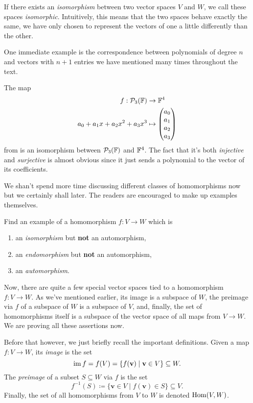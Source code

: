 If there exists an \emph{isomorphism} between two vector spaces $V$ and $W$, we
call these spaces \emph{isomorphic}. Intuitively, this means that the two spaces
behave exactly the same, we have only chosen to represent the vectors of one a
little differently than the other.

One immediate example is the correspondence between polynomials of degree $n$
and vectors with $n + 1$ entries we have mentioned many times throughout the
text.

The map
\begin{align*}
 f: \mathcal{P}_3(\mathbb{F}) &\to \mathbb{F}^{4}\\
 a_0 + a_1x + a_2x^2 + a_3x^3 & \mapsto 
 \begin{pmatrix}
  a_0\\
  a_1\\
  a_2\\
  a_3
 \end{pmatrix}
\end{align*}
from  is an isomorphism between $\mathcal{P}_3(\mathbb{F})$
and $\mathbb{F}^{4}$. The fact that it's both \emph{injective} and \emph{surjective} is
almost obvious since it just sends a polynomial to the vector of its
coefficients.

We shan't spend more time discussing different classes of homomorphisms now but
we certainly shall later. The readers are encouraged to make up examples
themselves.

\begin{exercise}{}{}
 Find an example of a homomorphism $f:V \to W$ which is
 \begin{enumerate}[label=(\alph*)]
  \item an \emph{isomorphism} but \textbf{not} an automorphism,
  \item an \emph{endomorphism} but \textbf{not} an automorphism,
  \item an \emph{automorphism}.
 \end{enumerate}
\end{exercise}

Now, there are quite a few special vector spaces tied to a homomorphism $f:V \to
W$. As we've mentioned earlier, its image is a subspace of $W$, the preimage via
$f$ of a subspace of $W$ is a subspace of $V$, and, finally, the set of
homomorphisms itself is a subspace of the vector space of all maps from $V \to
W$. We are proving all these assertions now.

Before that however, we just briefly recall the important definitions. Given a
map $f:V \to W$, its \emph{image} is the set
\[
 \operatorname{im} f = f(V) = \{f(\mathbf{v}) \mid \mathbf{v} \in V\} \subseteq W.
\]
The \emph{preimage} of a subset $S \subseteq W$ via $f$ is the set
\[
 f^{-1}(S) \coloneqq \{\mathbf{v} \in V \mid f(\mathbf{v}) \in S\} \subseteq V.
\]
Finally, the set of all homomorphisms from $V$ to $W$ is denoted $\operatorname{Hom}(V,W)$.

